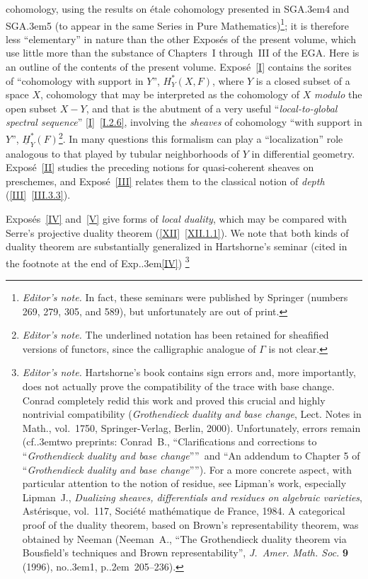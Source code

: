 \documentclass[11pt,a4paper,oneside]{book}
\providecommand{\sisi}[2]{#2}
\providecommand{\pageoriginale}{%
  \refstepcounter{pageoriginal}%
  \marginpar{\raggedright\footnotesize\bfseries\thepageoriginal}%
  \xspace}
\providecommand{\nde}[1]{\footnote{\textit{Editor's note.} #1}}
\providecommand{\de}[1]{\footnote{\textit{Editor's note.} #1}}
\providecommand{\og}{``}
\providecommand{\fg}{''\xspace}
\providecommand{\cf}{cf.\kern.3em}
\providecommand{\SGA}{\textup{SGA}\kern.3em}
\providecommand{\Exp}{Exp.\kern.3em}
\providecommand{\ptbl}{.\kern.2em}
\providecommand{\numero}{no.\kern.3em}
\providecommand{\sheaf}[1]{\underline{#1}}
\theoremstyle{plain}
\theoremstyle{definition}
\theoremstyle{remark}
\renewcommand{\Ref}[1]{\textup{\ref{#1}}}
\begin{document}
cohomology, using the results on \'etale cohomology presented in \SGA 4
and \SGA 5 (to appear in the same
\sisi{SERIES IN PURE MATHEMATICS}{Series in Pure Mathematics})\nde{In
fact, these seminars were published by Springer (numbers 269, 279, 305,
and 589), but unfortunately are out of print.}; it is therefore less
\og elementary\fg in nature than the other Expos\'es of the present
volume, which use little more than the substance of Chapters~I through~III
of the EGA. Here is an outline of the contents of the present volume.
Expos\'e~\Ref{I} contains the sorites of \og cohomology with support in
$Y$\fg, $H_Y^*(X,F)$, where $Y$ is a closed subset of a space $X$,
cohomology that may be interpreted as the cohomology of $X$ \emph{modulo}
the open subset $X-Y$, and that is the abutment of a very useful
\og \emph{local-to-global spectral sequence}\fg
\Ref{I}~\Ref{I.2.6}, involving the \emph{sheaves} of cohomology
\og with support in $Y$\fg, $\sheaf{H}_Y^*(F)$\nde{The underlined
notation has been retained for sheafified versions of functors, since the
calligraphic analogue of $\Gamma$ is not clear.}. In many questions this
formalism can\pageoriginale play a \og localization\fg role analogous to
that played by tubular neighborhoods of $Y$ in differential geometry.
Expos\'e~\Ref{II} studies the preceding notions for quasi-coherent sheaves
on preschemes, and Expos\'e~\Ref{III} relates them to the classical notion
of \emph{depth} (\Ref{III}~\Ref{III.3.3}).

Expos\'es~\Ref{IV} and~\Ref{V} give forms of \emph{local duality}, which
may be compared with Serre's projective duality theorem
(\Ref{XII}~\Ref{XII.1.1}). We note that both kinds of duality theorem are
substantially generalized in \sisi{HARTSHORNE}{Hartshorne}'s seminar
(cited in the footnote at the end of \Exp \Ref{IV})
\de{\label{noteconrad}Hartshorne's book contains sign errors and, more
importantly, does not actually prove the compatibility of the trace with
base change. Conrad completely redid this work and proved this crucial and
highly nontrivial compatibility (\textit{Grothendieck duality and base
change}, Lect. Notes in Math., vol.~1750, Springer-Verlag, Berlin, 2000).
Unfortunately, errors remain (\cf two preprints: Conrad~B.,
\og Clarifications and corrections to ``\textit{Grothendieck duality and
base change}''\fg\ and \og An addendum to Chapter 5 of
``\textit{Grothendieck duality and base change}''\fg). For a more concrete
aspect, with particular attention to the notion of residue, see Lipman's
work, especially Lipman~J., \textit{Dualizing sheaves, differentials and
residues on algebraic varieties}, Ast\'erisque, vol.~117, Soci\'et\'e
math\'ematique de France, 1984. A categorical proof of the duality theorem,
based on Brown's representability theorem, was obtained by Neeman
(Neeman~A., \og The Grothendieck duality theorem via Bousfield's techniques
and Brown representability\fg, \emph{J.~Amer. Math. Soc.} \textbf{9}
(1996), \numero 1, p\ptbl~205--236).}
\end{document}
